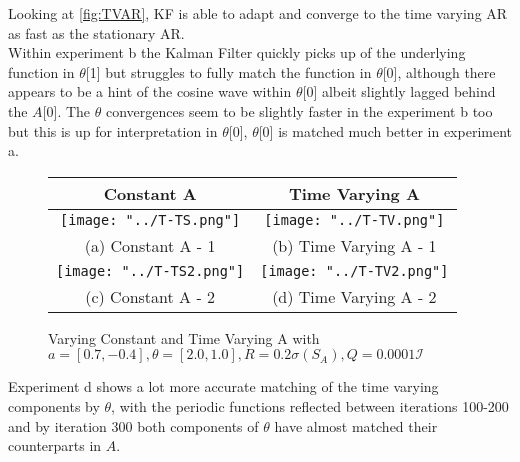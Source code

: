 \documentclass[sigconf]{acmart}
\begin{document}
Looking at \autoref{fig:TVAR}, KF is able to adapt and converge to the time varying AR as fast as the stationary AR.\\
Within experiment b the Kalman Filter quickly picks up of the underlying function in $\theta$[1] but struggles to fully match the function in $\theta$[0], although there appears to be a hint of the cosine wave within $\theta$[0] albeit slightly lagged behind the $A$[0].
The $\theta$ convergences seem to be slightly faster in the experiment b too but this is up for interpretation in $\theta$[0], $\theta$[0] is matched much better in experiment a. 
\begin{figure}[h]
  \centering

    \begin{tabular}{cc}
      \hline
      Constant A & Time Varying A \\
      \hline 
    \texttt{[image: "../T-TS.png"]} & \texttt{[image: "../T-TV.png"]} \\
    (a) Constant A - 1 & (b)  Time Varying A - 1\\[6pt]
    \texttt{[image: "../T-TS2.png"]} & \texttt{[image: "../T-TV2.png"]} \\
    (c) Constant A - 2 & (d)  Time Varying A - 2 \\[6pt]
    \end{tabular}
    \caption{Varying Constant and Time Varying A with $a = [0.7, -0.4], \theta = [2.0, 1.0], R = 0.2\sigma(S_{A}), Q = 0.0001\mathcal{I}$}
    \label{fig:TVAR}
\end{figure}

Experiment d shows a lot more accurate matching of the time varying components by $\theta$, with the periodic functions reflected between iterations 100-200 and by iteration 300 both components of $\theta$ have almost matched their counterparts in $A$.
\end{document}
